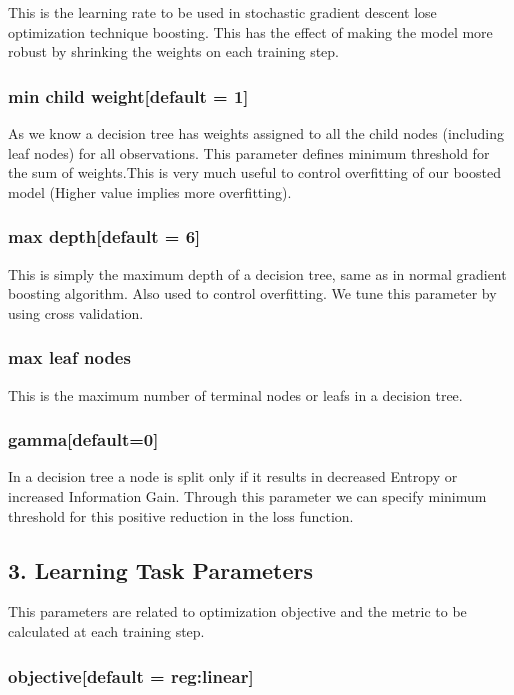 This is the learning rate to be used in stochastic gradient descent lose
optimization  technique boosting. This has the effect of making the model more
robust by shrinking the  weights on each training step.

\subsubsection{min child weight[default = 1]} 

As we know a decision tree has weights assigned to all the child nodes
(including leaf nodes) for all observations. This parameter defines minimum
threshold for the sum of  weights.This is very much useful to control
overfitting of our boosted model  (Higher  value implies more overfitting).

\subsubsection{max depth[default = 6]} 

This is simply the maximum depth of a decision tree, same as in normal gradient
boosting  algorithm. Also used to control overfitting. We tune this parameter by
using cross validation.

\subsubsection{max leaf nodes}

This is the maximum number of terminal nodes or leafs in a decision tree.

\subsubsection{gamma[default=0]} 

In a decision tree a node is split only if it results in decreased Entropy or
increased  Information Gain. Through this parameter  we can specify minimum
threshold for this positive  reduction in the loss function.

\subsection{3. Learning Task Parameters} 

This parameters are related to optimization objective and the metric to be
calculated at each training step.

\subsubsection{objective[default = reg:linear]}

